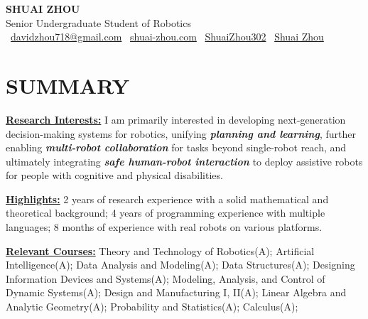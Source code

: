 \documentclass[a4paper,9pt]{extarticle}
\begin{document}
\pagestyle{fancy}
\renewcommand{\headrulewidth}{0pt}
\fancyhead{}
\thispagestyle{empty} %

\begin{center}
{\fontsize{24pt}{36pt}\selectfont\textbf{SHUAI ZHOU}}\\[3pt] %
Senior Undergraduate Student of Robotics \\[2pt]
\faEnvelope\ \href{mailto:davidzhou718@gmail.com}{davidzhou718@gmail.com}
\quad \textbar{} \quad
\faHome\ \href{https://www.shuai-zhou.com}{shuai-zhou.com}
\quad \textbar{} \quad
\faGithub\ \href{https://github.com/ShuaiZhou302}{ShuaiZhou302}
\quad \textbar{} \quad
\faGraduationCap\ \href{https://scholar.google.com/citations?user=ONn1TXAAAAAJ&hl=en&oi=sra}{Shuai Zhou}
\end{center}

\section*{{\textbf{\fontsize{14pt}{8pt}\selectfont S}\textbf{\scshape UMMARY}}}
\underline{\textbf{Research Interests:}} I am primarily interested in developing next-generation decision-making systems for robotics, unifying \textit{\textbf{planning and learning}}, further enabling \textit{\textbf{multi-robot collaboration}} for tasks beyond single-robot reach, and ultimately integrating \textit{\textbf{safe human-robot interaction}} to deploy assistive robots for people with cognitive and physical disabilities.
\par\vspace{4pt}\noindent
\underline{\textbf{Highlights:}} 2 years of research experience with a solid mathematical and theoretical background; 4 years of programming experience with multiple languages; 8 months of experience with real robots on various platforms.
\par\vspace{4pt}\noindent
\underline{\textbf{Relevant Courses:}} Theory and Technology of Robotics(A); Artificial Intelligence(A); Data Analysis and Modeling(A); Data Structures(A); Designing Information Devices and Systems(A); Modeling, Analysis, and Control of Dynamic Systems(A); Design and Manufacturing I, II(A); Linear Algebra and Analytic Geometry(A); Probability and Statistics(A); Calculus(A);
\end{document}

